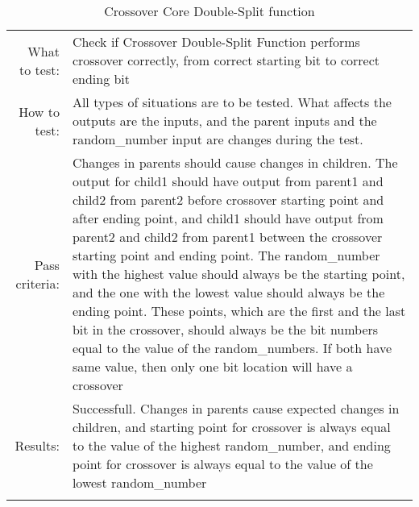 \begin{table}[H]
  \begin{tabular}{r | p{8cm}}
    \noalign{\smallskip}\hline\noalign{\smallskip}
    
    What to test:  & Check if Crossover Double-Split Function performs crossover
                     correctly, from correct starting bit to correct ending bit \\

    \noalign{\smallskip}\hline\noalign{\smallskip}

    How to test:   &    All types of situations are to be tested. 
                        What affects the outputs are the inputs, and the parent inputs            
                        and the random\_number input are changes during the test. 
                        \\
                      
    \noalign{\smallskip}\hline\noalign{\smallskip}

    Pass criteria: &    Changes in parents should cause changes in children. 
                        The output for child1 should have output from parent1 and child2
                        from parent2 before crossover starting point and after ending 
                        point, and child1 should have output from parent2 and child2
                        from parent1 between the crossover starting point and ending
                        point. 
                        The random\_number with the highest value should always be the 
                        starting point, and the one with the lowest value should always
                        be the ending point. 
                        These points, which are the first and the last bit in the 
                        crossover, should always be the bit numbers equal to the value     
                        of the random\_numbers. 
                        If both have same value, then only one bit location will have a
                        crossover
                        \\
    \noalign{\smallskip}\hline\noalign{\smallskip}
    
    Results: &      Successfull. 
                    Changes in parents cause expected changes in children, and starting 
                    point for crossover is always equal to the value of the highest 
                    random\_number, and ending point for crossover is always equal to 
                    the value of the lowest random\_number
                    \\
   \noalign{\smallskip}\hline\noalign{\smallskip}
  
  
  
  \end{tabular}
  \caption{Crossover Core Double-Split function}
  \label{testing:components:genetic_pipeline:crossover_core_doublesplit}
\end{table}
